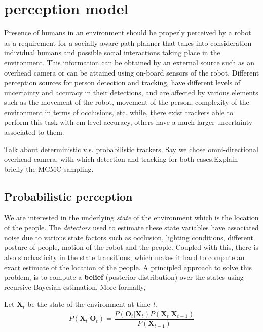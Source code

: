 \section{perception model}
\label{sec: perception model}

Presence of humans in an environment should be properly perceived by a robot as a requirement for a socially-aware path planner that takes into consideration individual humans and possible social interactions taking place in the environment. This information can be obtained by an external source such as an overhead camera or can be attained using on-board sensors of the robot. Different perception sources for person detection and tracking, have different levels of uncertainty and accuracy in their detections, and are affected by various elements such as the movement of the robot, movement of the person, complexity of the environment in terms of occlusions, etc. while, there exist trackers able to perform this task with cm-level accuracy, others have a much larger uncertainty associated to them. 

Talk about deterministic v.s. probabilistic trackers. 
Say we chose omni-directional overhead camera, with which detection and tracking for both cases.Explain briefly the MCMC sampling.

\subsection{Probabilistic perception}
We are interested in the underlying \textit{state} of the environment which is the location of the people. The \textit{detectors} used to estimate these state variables have associated noise due to various state factors such as occlusion, lighting conditions, different posture of people, motion of the robot and the people. Coupled with this, there is also stochasticity in the state transitions, which makes it hard to compute an exact estimate of the location of the people. A principled approach to solve this problem, is to compute a \textbf{belief} (posterior distribution) over the states using recursive Bayesian estimation. More formally,

Let $\textbf{X}_{t}$ be the state of the environment at time \textit{t}.
\begin{align}
P(\textbf{X}_{t} | \textbf{O}_{t}) = \dfrac{P(\textbf{O}_{t} | \textbf{X}_{t}) P(\textbf{X}_{t}|\textbf{X}_{t-1})} {P(\textbf{X}_{t-1})}
\end{align} 

